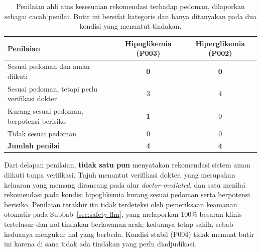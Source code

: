 \begin{table}[htbp]
\centering
\caption{Penilaian ahli atas kesesuaian rekomendasi terhadap pedoman, dilaporkan sebagai cacah penilai. Butir ini bersifat kategoris dan hanya ditanyakan pada dua kondisi yang menuntut tindakan.}
\label{tab:pedoman-ahli}
\small
\begin{tabularx}{\textwidth}{@{}Lcc@{}}
\toprule
\textbf{Penilaian} & \textbf{Hipoglikemia (P003)} & \textbf{Hiperglikemia (P002)} \\
\midrule
Sesuai pedoman dan aman diikuti & \textbf{0} & \textbf{0} \\
Sesuai pedoman, tetapi perlu verifikasi dokter & 3 & 4 \\
Kurang sesuai pedoman, berpotensi berisiko & \textbf{1} & 0 \\
Tidak sesuai pedoman & 0 & 0 \\
\midrule
\textbf{Jumlah penilai} & \textbf{4} & \textbf{4} \\
\bottomrule
\end{tabularx}

\vspace{0.4em}
{\tabnotestyle Dari delapan penilaian, \textbf{tidak satu pun} menyatakan rekomendasi sistem aman diikuti tanpa verifikasi. Tujuh menuntut verifikasi dokter, yang merupakan keluaran yang memang dirancang pada alur \emph{doctor-mediated}, dan satu menilai rekomendasi pada kondisi hipoglikemia kurang sesuai pedoman serta berpotensi berisiko. Penilaian terakhir itu tidak terdeteksi oleh pemeriksaan keamanan otomatis pada Subbab~\ref{sec:safety-llm}, yang melaporkan 100\% besaran klinis tertelusur dan nol tindakan berlawanan arah; keduanya tetap sahih, sebab keduanya mengukur hal yang berbeda. Kondisi stabil (P004) tidak memuat butir ini karena di sana tidak ada tindakan yang perlu diadjudikasi.\par}
\end{table}

